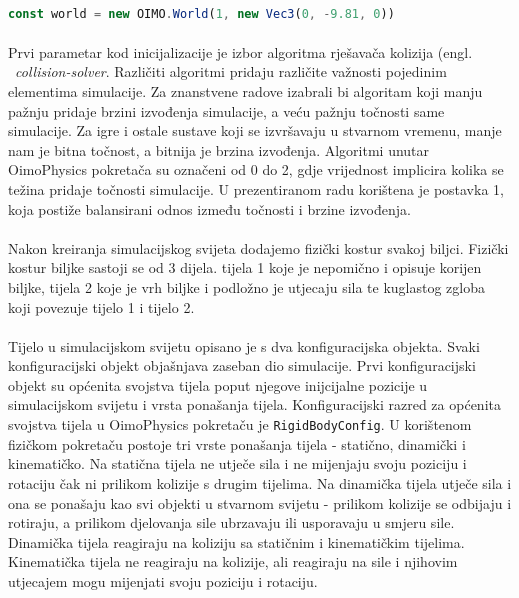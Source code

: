 \documentclass[times, utf8, diplomski]{fer}
\begin{document}
\paragraph{}

\begin{lstlisting}[language=Javascript,caption=Postavljanje simulacijskog svijeta, label=code33-1]
const world = new OIMO.World(1, new Vec3(0, -9.81, 0))
\end{lstlisting}

\paragraph{}
Prvi parametar kod inicijalizacije je izbor algoritma rješavača kolizija (engl. \
\textit{collision-solver}. Različiti algoritmi pridaju različite važnosti pojedinim 
elementima simulacije. Za znanstvene radove izabrali bi algoritam koji manju pažnju pridaje
brzini izvođenja simulacije, a veću pažnju točnosti same simulacije. Za igre i ostale 
sustave koji se izvršavaju u stvarnom vremenu, manje nam je bitna točnost, a bitnija je 
brzina izvođenja. Algoritmi unutar OimoPhysics pokretača su označeni od 0 do 2, gdje 
vrijednost implicira kolika se težina pridaje točnosti simulacije. U prezentiranom radu
korištena je postavka 1, koja postiže balansirani odnos između točnosti i brzine izvođenja.

\paragraph{}
Nakon kreiranja simulacijskog svijeta dodajemo fizički kostur svakoj biljci. Fizički kostur 
biljke sastoji se od 3 dijela. tijela 1 koje je nepomično i opisuje korijen biljke, tijela 2 
koje je vrh biljke i podložno je utjecaju sila te kuglastog zgloba koji povezuje tijelo 1 i
tijelo 2.

\paragraph{}
Tijelo u simulacijskom svijetu opisano je s dva konfiguracijska objekta. Svaki 
konfiguracijski objekt objašnjava zaseban dio simulacije. Prvi konfiguracijski objekt su
općenita svojstva tijela poput njegove inijcijalne pozicije u simulacijskom svijetu i vrsta
ponašanja tijela. Konfiguracijski razred za općenita svojstva tijela u OimoPhysics pokretaču 
je \verb#RigidBodyConfig#. U korištenom fizičkom pokretaču postoje tri vrste
ponašanja tijela - statično, dinamički i kinematičko. Na statična tijela ne utječe sila i 
ne mijenjaju svoju poziciju i rotaciju čak ni prilikom kolizije s drugim tijelima. Na 
dinamička tijela utječe sila i ona se ponašaju kao svi objekti u stvarnom svijetu - prilikom 
kolizije se odbijaju i rotiraju, a prilikom djelovanja sile ubrzavaju ili usporavaju u 
smjeru sile. Dinamička tijela reagiraju na koliziju sa statičnim i kinematičkim tijelima. 
Kinematička tijela ne reagiraju na kolizije, ali reagiraju na sile i njihovim utjecajem mogu 
mijenjati svoju poziciju i rotaciju.
\end{document}
